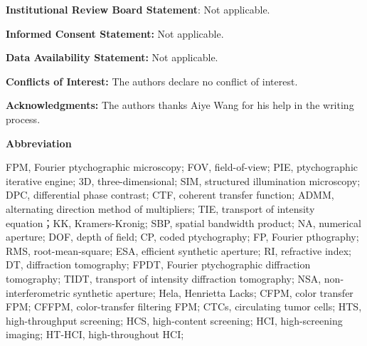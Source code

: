 \documentclass[journal,review,submit,pdftex,moreauthors]{Definitions/mdpi}
\begin{document}
\noindent\textbf{Institutional Review Board Statement}: Not applicable.\\ \vspace{-0.5em}

\noindent\textbf{Informed Consent Statement:} Not applicable. \\ \vspace{-0.5em}

\noindent\textbf{Data Availability Statement:} Not applicable. \\ \vspace{-0.5em}

\noindent\textbf{Conflicts of Interest:} The authors declare no conflict of interest.  \\ \vspace{-0.5em}

\noindent\textbf{Acknowledgments:} The authors thanks Aiye Wang for his help in the writing process. \\ \vspace{-0.1em}

\noindent\textbf{Abbreviation}

FPM, Fourier ptychographic microscopy; FOV, field-of-view; PIE, ptychographic iterative engine; 3D, three-dimensional; SIM, structured illumination microscopy; DPC, differential phase contrast; CTF, coherent transfer function; ADMM, alternating direction method of multipliers; TIE, transport of intensity equation；KK, Kramers-Kronig; SBP, spatial bandwidth product; NA, numerical aperture; DOF, depth of field; CP, coded ptychography; FP, Fourier pthography; RMS, root-mean-square; ESA, efficient synthetic aperture; RI, refractive index; DT, diffraction tomography; FPDT, Fourier ptychographic diffraction tomography; TIDT, transport of intensity diffraction tomography; NSA, non-interferometric synthetic aperture; Hela, Henrietta Lacks; CFPM, color transfer FPM; CFFPM, color-transfer filtering FPM; CTCs, circulating tumor cells; HTS, high-throughput screening; HCS, high-content screening; HCI, high-screening imaging; HT-HCI, high-throughout HCI; 


\printbibliography
\end{document}
